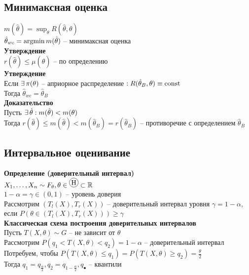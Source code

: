 \documentclass[12pt]{article}
\begin{document}
\subsection{Минимаксная оценка}
$m(\hat \theta) = \sup_\theta R(\hat \theta, \theta)$\\
$\hat \theta_{wc} = \operatorname{argmin} m(\hat \theta)$ -- минимаксная оценка\\
\textbf{Утверждение}\\
$r(\hat \theta) \leq \mu(\hat \theta)$ -- по определению\\
\textbf{Утверждение}\\
Если $\exists\, \pi(\theta)$ -- априорное распределение $: R(\hat \theta_B, \theta) \equiv \operatorname{const}$\\
Тогда $\hat \theta_{wc} = \hat\theta_B$\\
\textbf{Доказательство}\\
Пусть $\exists\, \hat \theta: m(\hat \theta) < m(\theta)$\\
Тогда $r(\hat \theta) \leq m(\hat \theta) < m(\hat \theta_B) = r(\hat \theta_B)$ -- противоречие с определением $\hat \theta_B$\\
\subsection{Интервальное оценивание}
\textbf{Определение (доверительный интервал)}\\
$X_1, \ldots, X_n \sim F_\theta, \theta \in \encirc H \subset \Rset$\\
$1 - \alpha = \gamma \in (0, 1)$ -- уровень доверия\\
Рассмотрим $(T_l(X), T_r(X))$ -- доверительный интервал уровня $\gamma = 1-\alpha$, если $P(\theta \in (T_l(X), T_r(X))) \geq \gamma$\\
\textbf{Классическая схема построения доверительных интервалов}\\
Пусть $T(X, \theta) \sim G$ -- не зависит от $\theta$\\
Рассмотрим $P(q_1 < T(X, \theta) < q_2) = 1-\alpha$ -- доверительный интервал\\
Потребуем, чтобы $P(T(X, \theta) \leq q_1) = P(T(X, \theta) \geq q_2) = \frac\theta2$\\
Тогда $q_1 = q_{\frac\alpha2}, q_2 = q_{1-\frac\alpha2}, q_\bullet$ -- квантили\\
\end{document}
